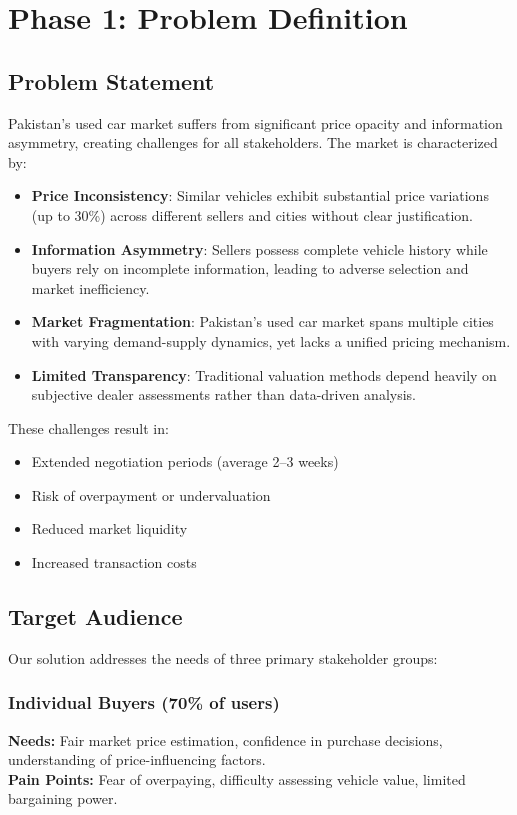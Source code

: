 \documentclass[12pt,a4paper]{article}
\begin{document}
\section{Phase 1: Problem Definition}

\subsection{Problem Statement}

Pakistan's used car market suffers from significant price opacity and information asymmetry, creating challenges for all stakeholders. The market is characterized by:

\begin{itemize}[leftmargin=*]
    \item \textbf{Price Inconsistency}: Similar vehicles exhibit substantial price variations (up to 30\%) across different sellers and cities without clear justification.
    \item \textbf{Information Asymmetry}: Sellers possess complete vehicle history while buyers rely on incomplete information, leading to adverse selection and market inefficiency.
    \item \textbf{Market Fragmentation}: Pakistan's used car market spans multiple cities with varying demand-supply dynamics, yet lacks a unified pricing mechanism.
    \item \textbf{Limited Transparency}: Traditional valuation methods depend heavily on subjective dealer assessments rather than data-driven analysis.
\end{itemize}

These challenges result in:
\begin{itemize}
    \item Extended negotiation periods (average 2--3 weeks)
    \item Risk of overpayment or undervaluation
    \item Reduced market liquidity
    \item Increased transaction costs
\end{itemize}

\subsection{Target Audience}

Our solution addresses the needs of three primary stakeholder groups:

\subsubsection{Individual Buyers (70\% of users)}
\textbf{Needs:} Fair market price estimation, confidence in purchase decisions, understanding of price-influencing factors.\\
\textbf{Pain Points:} Fear of overpaying, difficulty assessing vehicle value, limited bargaining power.
\end{document}
